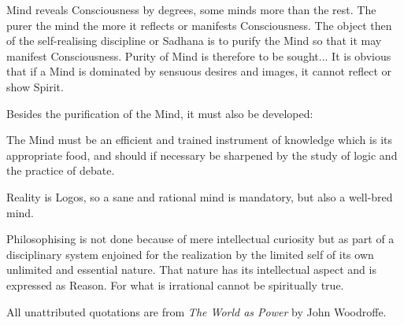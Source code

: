 \begin{quotex}
Mind reveals Consciousness by degrees, some minds more than the rest. The purer the mind the more it reflects or manifests Consciousness. The object then of the self-realising discipline or Sadhana is to purify the Mind so that it may manifest Consciousness. Purity of Mind is therefore to be sought... It is obvious that if a Mind is dominated by sensuous desires and images, it cannot reflect or show Spirit.
\end{quotex}


Besides the purification of the Mind, it must also be developed:

\begin{quotex}
The Mind must be an efficient and trained instrument of knowledge which is its appropriate food, and should if necessary be sharpened by the study of logic and the practice of debate.
\end{quotex}


Reality is Logos, so a sane and rational mind is mandatory, but also a well-bred mind.

\begin{quotex}
Philosophising is not done because of mere intellectual curiosity but as part of a disciplinary system enjoined for the realization by the limited self of its own unlimited and essential nature. That nature has its intellectual aspect and is expressed as Reason. For what is irrational cannot be spiritually true.
\end{quotex}

All unattributed quotations are from \emph{The World as Power} by John Woodroffe.




